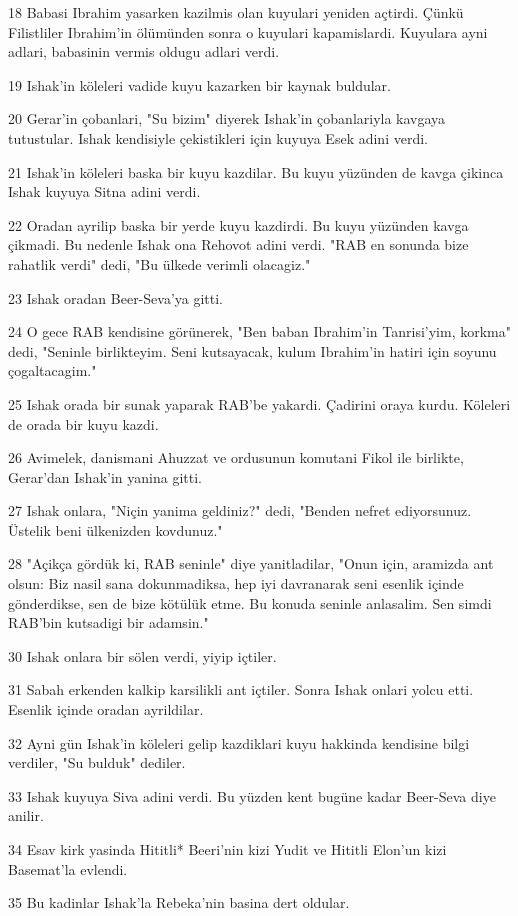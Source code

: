 \par 18 Babasi Ibrahim yasarken kazilmis olan kuyulari yeniden açtirdi. Çünkü Filistliler Ibrahim'in ölümünden sonra o kuyulari kapamislardi. Kuyulara ayni adlari, babasinin vermis oldugu adlari verdi.
\par 19 Ishak'in köleleri vadide kuyu kazarken bir kaynak buldular.
\par 20 Gerar'in çobanlari, "Su bizim" diyerek Ishak'in çobanlariyla kavgaya tutustular. Ishak kendisiyle çekistikleri için kuyuya Esek adini verdi.
\par 21 Ishak'in köleleri baska bir kuyu kazdilar. Bu kuyu yüzünden de kavga çikinca Ishak kuyuya Sitna adini verdi.
\par 22 Oradan ayrilip baska bir yerde kuyu kazdirdi. Bu kuyu yüzünden kavga çikmadi. Bu nedenle Ishak ona Rehovot adini verdi. "RAB en sonunda bize rahatlik verdi" dedi, "Bu ülkede verimli olacagiz."
\par 23 Ishak oradan Beer-Seva'ya gitti.
\par 24 O gece RAB kendisine görünerek, "Ben baban Ibrahim'in Tanrisi'yim, korkma" dedi, "Seninle birlikteyim. Seni kutsayacak, kulum Ibrahim'in hatiri için soyunu çogaltacagim."
\par 25 Ishak orada bir sunak yaparak RAB'be yakardi. Çadirini oraya kurdu. Köleleri de orada bir kuyu kazdi.
\par 26 Avimelek, danismani Ahuzzat ve ordusunun komutani Fikol ile birlikte, Gerar'dan Ishak'in yanina gitti.
\par 27 Ishak onlara, "Niçin yanima geldiniz?" dedi, "Benden nefret ediyorsunuz. Üstelik beni ülkenizden kovdunuz."
\par 28 "Açikça gördük ki, RAB seninle" diye yanitladilar, "Onun için, aramizda ant olsun: Biz nasil sana dokunmadiksa, hep iyi davranarak seni esenlik içinde gönderdikse, sen de bize kötülük etme. Bu konuda seninle anlasalim. Sen simdi RAB'bin kutsadigi bir adamsin."
\par 30 Ishak onlara bir sölen verdi, yiyip içtiler.
\par 31 Sabah erkenden kalkip karsilikli ant içtiler. Sonra Ishak onlari yolcu etti. Esenlik içinde oradan ayrildilar.
\par 32 Ayni gün Ishak'in köleleri gelip kazdiklari kuyu hakkinda kendisine bilgi verdiler, "Su bulduk" dediler.
\par 33 Ishak kuyuya Siva adini verdi. Bu yüzden kent bugüne kadar Beer-Seva diye anilir.
\par 34 Esav kirk yasinda Hititli* Beeri'nin kizi Yudit ve Hititli Elon'un kizi Basemat'la evlendi.
\par 35 Bu kadinlar Ishak'la Rebeka'nin basina dert oldular.

